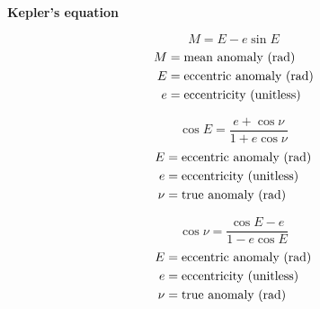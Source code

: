 \documentclass{article}
\begin{document}
\textbf{Kepler's equation}
\begin{multicols}{3}
	\begin{equation*}
	\boxed{M = E - e \sin E}
	\end{equation*}
	\vfill\null
	\columnbreak
	\begin{align*}
	M &= \text{mean anomaly (\si{\radian})}\\
	E &= \text{eccentric anomaly (\si{\radian})}\\
	e &= \text{eccentricity (unitless)}\\
	\end{align*}
\end{multicols}

\begin{multicols}{3}
	\begin{equation*}
	\boxed{\cos E = \dfrac{e + \cos \nu}{1 + e \cos \nu}}
	\end{equation*}
	\vfill\null
	\columnbreak
	\begin{align*}
	E &= \text{eccentric anomaly (\si{\radian})}\\
	e &= \text{eccentricity (unitless)}\\
	\nu &= \text{true anomaly (\si{\radian})}\\
	\end{align*}
\end{multicols}

\begin{multicols}{3}
	\begin{equation*}
	\boxed{\cos \nu = \dfrac{\cos E - e}{1 - e \cos E}}
	\end{equation*}
	\vfill\null
	\columnbreak
	\begin{align*}
	E &= \text{eccentric anomaly (\si{\radian})}\\
	e &= \text{eccentricity (unitless)}\\
	\nu &= \text{true anomaly (\si{\radian})}\\
	\end{align*}
\end{multicols}
\end{document}
